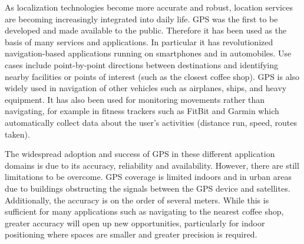 As localization technologies become more accurate and robust, location services are becoming increasingly integrated into daily life.
GPS was the first to be developed and made available to the public. Therefore it has been used as the basis of many services and applications.
In particular it has revolutionized navigation-based applications running on smartphones and in automobiles. Use cases include point-by-point directions between destinations and identifying nearby facilities or points of interest (such as the closest coffee shop).
GPS is also widely used in navigation of other vehicles such as airplanes, ships, and heavy equipment. It has also been used for monitoring movements rather than navigating, for example in fitness trackers such as FitBit \cite{FB} and Garmin\cite{Garmin} which automatically collect data about the user's activities (distance run, speed, routes taken).

The widespread adoption and success of GPS in these different application domains is due to its accuracy, reliability and availability. However, there are still limitations to be overcome. GPS coverage is limited indoors and in urban areas due to buildings obstructing the signals between the GPS device and satellites. Additionally, the accuracy is on the order of several meters. While this is sufficient for many applications such as navigating to the nearest coffee shop, greater accuracy will open up new opportunities, particularly for indoor positioning where spaces are smaller and greater precision is required.

